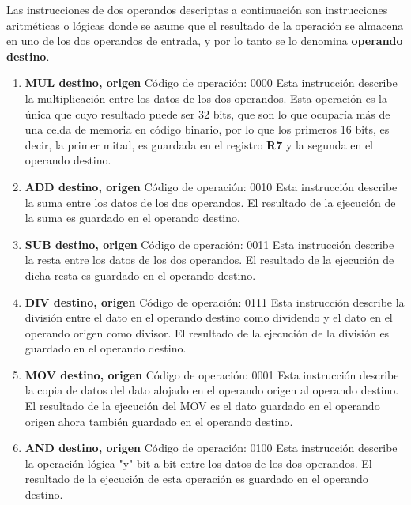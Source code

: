 


Las instrucciones de dos operandos descriptas a continuación son instrucciones aritméticas o lógicas donde se asume que el resultado de la operación se almacena en uno de los dos operandos de entrada, y por lo tanto se lo denomina \textbf{operando destino}.

\begin{enumerate}
\item \textbf{MUL destino, origen}
Código de operación: 0000
Esta instrucción describe la multiplicación entre los datos de los dos operandos. Esta operación es la única que cuyo resultado puede ser 32 bits, que son lo que ocuparía más de una celda de memoria en código binario, por lo que los primeros 16 bits, es decir, la primer mitad, es guardada en el registro \textbf{R7} y la segunda en el operando destino.
 
\item \textbf{ADD destino, origen}
Código de operación: 0010
Esta instrucción describe la suma entre los datos de los dos operandos. El resultado de la ejecución de la suma es guardado en el operando destino.

\item \textbf{SUB destino, origen}
Código de operación: 0011
Esta instrucción describe la resta entre los datos de los dos operandos. El resultado de la ejecución de dicha resta es guardado en el operando destino.

\item \textbf{DIV destino, origen}
Código de operación: 0111
Esta instrucción describe la división entre el dato en el operando destino como dividendo y el dato en el operando origen como divisor. El resultado de la ejecución de la división es guardado en el operando destino.

\item \textbf{MOV destino, origen}
Código de operación: 0001
Esta instrucción describe la copia de datos del dato alojado en el operando origen al operando destino. El resultado de la ejecución del MOV es el dato guardado en el operando origen ahora también guardado en el operando destino.

\item \textbf{AND destino, origen}
Código de operación: 0100
Esta instrucción describe la operación lógica "y" bit a bit entre los datos de los dos operandos. El resultado de la ejecución de esta operación es guardado en el operando destino.


\end{enumerate}
